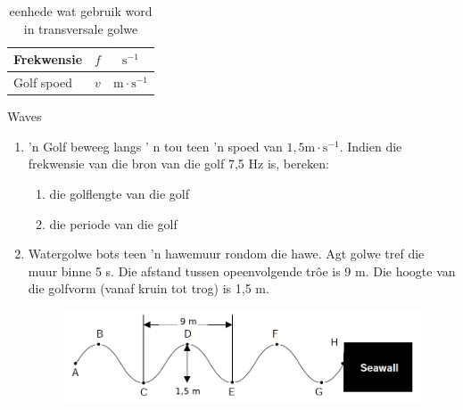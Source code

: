 \begin{definition}
\begin{table}[H]
\begin{center}
\begin{tabular}{|l|c|c|c|}
Frekwensie & $f$ & \multicolumn{2}{c|}{$\text{s}^{-1}$}  \\ \hline
Golf spoed & $v$ & \multicolumn{2}{c|}{$\text{m} \cdot \text{s}^{-1}$} \\ \hline
\end{tabular}
\end{center}
\caption{eenhede wat gebruik word in transversale golwe}
\label{table:electricity::units}
\end{table}
    \begin{eocexercises}{Waves}
            \nopagebreak
\label{m38806*id324367}\begin{enumerate}[noitemsep, label=\textbf{\arabic*}. ] 
\label{m38806*uid128}\item  'n Golf beweeg langs ' n tou teen 'n spoed van $1,5\text{m}\ensuremath{\cdot}\text{s}{}^{-1}$. Indien die frekwensie van die bron van die golf 7,5 Hz is, bereken:
\label{m38806*id324525}\begin{enumerate}[noitemsep, label=\textbf{\alph*}. ] 
            \label{m38806*uid129}\item die golflengte van die golf
\label{m38806*uid130}\item die periode van die golf
\end{enumerate}
                \item Watergolwe bots teen 'n  hawemuur rondom die hawe. Agt golwe tref die muur
           binne 5 s. Die afstand tussen opeenvolgende trôe is 9 m. Die hoogte van
          die golfvorm (vanaf kruin tot trog) is 1,5 m.
    \setcounter{subfigure}{0}
	\begin{figure}[H] %
    \begin{center}
    \label{m38806*id634524!!!underscore!!!media}\label{m38806*id634524!!!underscore!!!printimage}\includegraphics[width=0.8\columnwidth]{col11305.imgs/m38806_seawall.png} %
      \vspace{2pt}
    \vspace{.1in}
    \end{center}
 \end{figure}       
\label{m38806*uid081231}\begin{enumerate}[noitemsep, label=\textbf{\alph*}. ] 

\end{enumerate}
\end{enumerate}
\end{eocexercises}
\end{definition}
